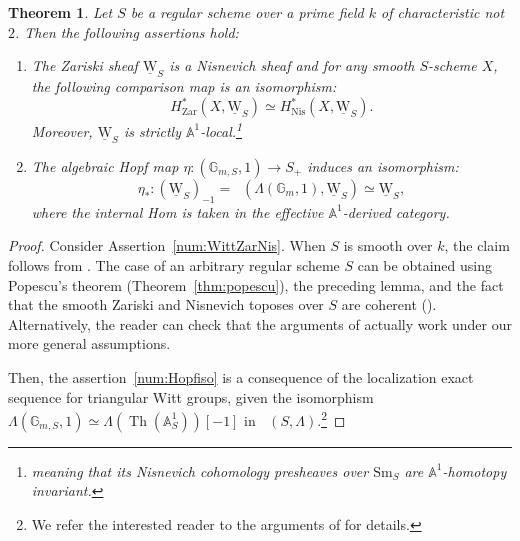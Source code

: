 \documentclass[JEP,XML,SOM,Unicode]{cedram}
\renewcommand{\AA}{\mathbb A}
\newcommand{\uW}{\underline{\mathrm W}}
\newcommand{\eff}{\mathrm{eff}}
\newcommand{\sm}{\mathrm{Sm}}
\DeclareMathOperator{\DAeff}{D_{\AA^1}^{\eff}}
\DeclareMathOperator{\uHom}{\underline{Hom}}
\DeclareMathOperator{\Th}{Th}
\newcommand{\GG} {\mathbb{G}_m}
\newcommand{\GGx}[1] {\mathbb{G}_{m,#1}}
\newcommand{\nis}{\mathrm{Nis}}
\newcommand{\zar}{\mathrm{Zar}}
\newtheorem{thm}{Theorem}[section]
\theoremstyle{remark}
\theoremstyle{definition}
\numberwithin{equation}{thm}
\begin{document}
\begin{thm}\label{thm:representability_Witt}
Let $S$ be a regular scheme over a prime field $k$ of characteristic not~$2$.
Then the following assertions hold:
\begin{enumerate}
\item
\label{num:WittZarNis}
The Zariski sheaf $\uW_S$ is a Nisnevich sheaf and for any smooth $S$-scheme $X$,
the following comparison map is an isomorphism:
\begin{equation}
H^*_\zar(X,\uW_S) \simeq H^*_\nis(X,\uW_S).
\end{equation}
Moreover, $\uW_S$ is strictly $\AA^1$-local.\footnote{meaning that
its Nisnevich cohomology presheaves over $\sm_S$ are $\AA^1$-homotopy invariant.}
\item
\label{num:Hopfiso}
The algebraic Hopf map $\eta:(\GGx S,1) \to S_+$
induces an isomorphism:
\begin{equation}
\label{eq:Witt_Susp}
\eta_*:(\uW_S)_{-1}=\uHom(\Lambda(\GG,1),\uW_S) \simeq \uW_S,
\end{equation}
where the internal Hom is taken in the effective $\AA^1$-derived category.
\end{enumerate}
\end{thm}
\begin{proof}
Consider Assertion~\eqref{num:WittZarNis}.
When $S$ is smooth over $k$, the claim follows from \cite{Panin}.
The case of an arbitrary regular scheme $S$
can be obtained using Popescu's theorem (Theorem~\ref{thm:popescu}), the preceding lemma, and the fact that the smooth Zariski and Nisnevich toposes over $S$ are coherent (\cite[Exp.\,VI, 2.3]{SGA4}).
Alternatively, the reader can check that the arguments of \cite{Panin} actually work under our more general assumptions.

Then, the assertion~\eqref{num:Hopfiso} is a consequence of the localization exact sequence for triangular Witt groups,
given the isomorphism $\Lambda(\GGx S,1) \simeq \Lambda(\Th(\AA^1_S))[-1]$
in $\DAeff(S,\Lambda)$.\footnote{We refer the interested
reader to the arguments of \cite[Lem.\,3.8]{CF1} for details.}
\end{proof}
\end{document}
